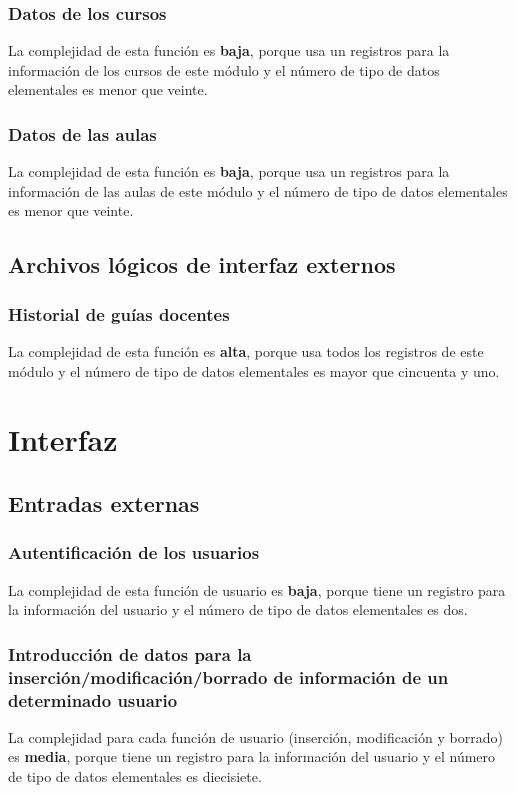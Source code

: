 \documentclass[11pt,a4paper,spanish,twoside]{book}
\begin{document}
\subsubsection{Datos de los cursos}
La complejidad de esta función es \textbf{baja}, porque usa un
registros para la información de los cursos de este módulo y el número
de tipo de datos elementales es menor que veinte.

\subsubsection{Datos de las aulas}
La complejidad de esta función es \textbf{baja}, porque usa un
registros para la información de las aulas de este módulo y el número
de tipo de datos elementales es menor que veinte.
\subsection{Archivos lógicos de interfaz externos}
\subsubsection{Historial de guías docentes}
La complejidad de esta función es \textbf{alta}, porque usa todos los
registros de este módulo y el número de tipo de datos elementales es mayor
que cincuenta y uno. 


\section{Interfaz}
\subsection{Entradas externas}
\subsubsection{Autentificación de los usuarios}
La complejidad de esta función de usuario es \textbf{baja}, porque tiene un
registro para la información del usuario y el número de tipo de datos
elementales es dos. 

\subsubsection{Introducción de datos para la inserción/modificación/borrado 
de información de un determinado usuario}
La complejidad para cada función de usuario (inserción, modificación y
borrado) es \textbf{media}, porque tiene un registro para la información del
usuario y el número de tipo de datos elementales es diecisiete.
\end{document}
